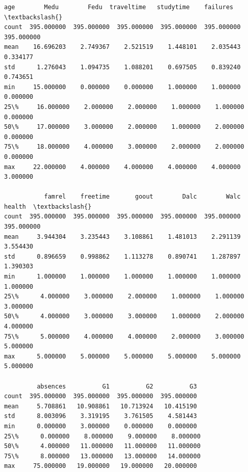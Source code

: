 \documentclass[9pt]{article}
\makeatletter
\newcommand{\boxspacing}{\kern\kvtcb@left@rule\kern\kvtcb@boxsep}
\newcommand{\prompt}[4]{
        {\ttfamily\llap{{\color{#2}[#3]:\hspace{3pt}#4}}\vspace{-\baselineskip}}
    }
\makeatother
\begin{document}
            \begin{tcolorbox}[breakable, size=fbox, boxrule=.5pt, pad at break*=1mm, opacityfill=0]
\prompt{Out}{outcolor}{5}{\boxspacing}
\begin{Verbatim}[commandchars=\\\{\}]
              age        Medu        Fedu  traveltime   studytime    failures  \textbackslash{}
count  395.000000  395.000000  395.000000  395.000000  395.000000  395.000000
mean    16.696203    2.749367    2.521519    1.448101    2.035443    0.334177
std      1.276043    1.094735    1.088201    0.697505    0.839240    0.743651
min     15.000000    0.000000    0.000000    1.000000    1.000000    0.000000
25\%     16.000000    2.000000    2.000000    1.000000    1.000000    0.000000
50\%     17.000000    3.000000    2.000000    1.000000    2.000000    0.000000
75\%     18.000000    4.000000    3.000000    2.000000    2.000000    0.000000
max     22.000000    4.000000    4.000000    4.000000    4.000000    3.000000

           famrel    freetime       goout        Dalc        Walc      health  \textbackslash{}
count  395.000000  395.000000  395.000000  395.000000  395.000000  395.000000
mean     3.944304    3.235443    3.108861    1.481013    2.291139    3.554430
std      0.896659    0.998862    1.113278    0.890741    1.287897    1.390303
min      1.000000    1.000000    1.000000    1.000000    1.000000    1.000000
25\%      4.000000    3.000000    2.000000    1.000000    1.000000    3.000000
50\%      4.000000    3.000000    3.000000    1.000000    2.000000    4.000000
75\%      5.000000    4.000000    4.000000    2.000000    3.000000    5.000000
max      5.000000    5.000000    5.000000    5.000000    5.000000    5.000000

         absences          G1          G2          G3
count  395.000000  395.000000  395.000000  395.000000
mean     5.708861   10.908861   10.713924   10.415190
std      8.003096    3.319195    3.761505    4.581443
min      0.000000    3.000000    0.000000    0.000000
25\%      0.000000    8.000000    9.000000    8.000000
50\%      4.000000   11.000000   11.000000   11.000000
75\%      8.000000   13.000000   13.000000   14.000000
max     75.000000   19.000000   19.000000   20.000000
\end{Verbatim}
\end{tcolorbox}
        
\end{document}
